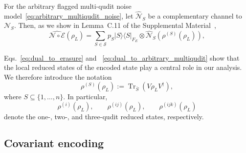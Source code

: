 \documentclass[10pt,twocolumn,superscriptaddress,aps,amsmath,amssymb,citeautoscript,floatfix,prx,longbibliography]{revtex4-2}
\theoremstyle{plain}
\theoremstyle{plain}
\theoremstyle{plain}
\theoremstyle{plain}
\theoremstyle{plain}
\theoremstyle{plain}
\begin{document}
For the arbitrary flagged multi-qudit noise model~\eqref{eq:arbitrary_multiqudit_noise},
let \(\widehat{\mathcal N}_S\) be a complementary channel to \(\mathcal N_S\).
Then, as we show in Lemma~C.11 of the Supplemental Material~\cite{SuppMat}, 
\begin{equation}\label{eq:dual_to_arbitrary_multiqudit}
    \widehat{\mathcal N\circ\mathcal E}(\rho_L)
    =
    \sum_{S\in\mathcal S}
    p_S
    |S\rangle\langle S|_{F_E}
    \otimes
    \widehat{\mathcal N}_S
    \left(
        \rho^{(S)}(\rho_L)
    \right),
\end{equation}

Eqs.~\eqref{eq:dual_to_erasure} and ~\eqref{eq:dual_to_arbitrary_multiqudit} show that the
local reduced states of the encoded state play a central role in our analysis.
We therefore introduce the notation
\begin{equation}\label{eq:reduced_state}
    \rho^{(S)}(\rho_L)
    :=
    \operatorname{Tr}_{\bar S}
    \left(
        V\rho_LV^\dagger
    \right),
\end{equation}
where \(S\subseteq\{1,\ldots,n\}\). In particular,
\[
    \rho^{(i)}(\rho_L),\qquad
    \rho^{(ij)}(\rho_L),\qquad
    \rho^{(ijk)}(\rho_L)
\]
denote the one-, two-, and three-qudit reduced states, respectively.

\subsection{Covariant encoding}\label{subsec:main_covar_enc}
\end{document}
